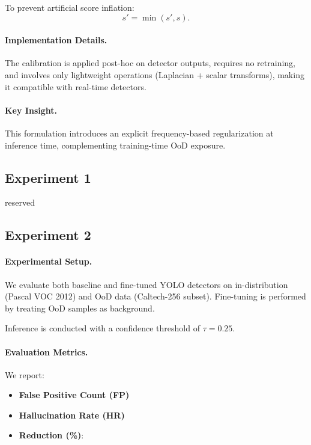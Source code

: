 To prevent artificial score inflation:
\begin{equation}
    s' = \min(s', s).
\end{equation}

\paragraph{Implementation Details.}
The calibration is applied post-hoc on detector outputs, requires no retraining, and involves only lightweight operations (Laplacian + scalar transforms), making it compatible with real-time detectors.

\paragraph{Key Insight.}
This formulation introduces an explicit frequency-based regularization at inference time, complementing training-time OoD exposure.

\subsection{Experiment 1}

reserved

\subsection{Experiment 2}

\paragraph{Experimental Setup.}
We evaluate both baseline and fine-tuned YOLO detectors on in-distribution (Pascal VOC 2012) and OoD data (Caltech-256 subset). Fine-tuning is performed by treating OoD samples as background.

Inference is conducted with a confidence threshold of $\tau = 0.25$.

\paragraph{Evaluation Metrics.}
We report:
\begin{itemize}
    \item \textbf{False Positive Count (FP)}
    \item \textbf{Hallucination Rate (HR)}
    \item \textbf{Reduction (\%)}:
\end{itemize}

